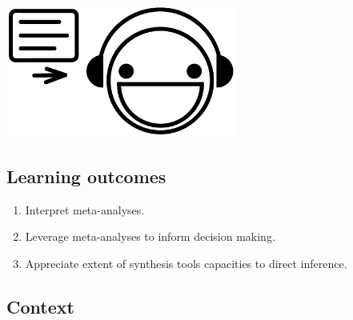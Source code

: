 \documentclass[
]{book}
\providecommand{\tightlist}{%
  \setlength{\itemsep}{0pt}\setlength{\parskip}{0pt}}
\begin{document}
\includegraphics[width=3in,height=\textheight]{./happy.png}

\hypertarget{learning-outcomes-4}{%
\subsection*{Learning outcomes}\label{learning-outcomes-4}}

\begin{enumerate}
\def\labelenumi{\arabic{enumi}.}
\tightlist
\item
  Interpret meta-analyses.\\
\item
  Leverage meta-analyses to inform decision making.\\
\item
  Appreciate extent of synthesis tools capacities to direct inference.
\end{enumerate}

\hypertarget{context-3}{%
\subsection*{Context}\label{context-3}}
\end{document}
